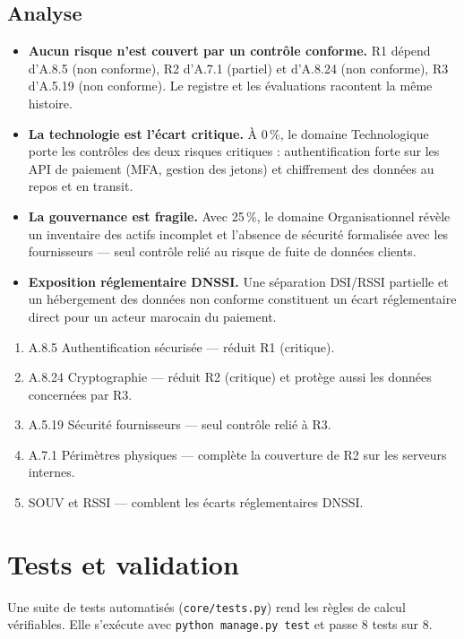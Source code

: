 \documentclass[11pt,a4paper]{article}
\newcommand{\code}[1]{\texttt{#1}}
\begin{document}
\subsection{Analyse}
\begin{itemize}
  \item \textbf{Aucun risque n'est couvert par un contrôle conforme.} R1 dépend d'A.8.5 (non conforme), R2 d'A.7.1 (partiel) et d'A.8.24 (non conforme), R3 d'A.5.19 (non conforme). Le registre et les évaluations racontent la même histoire.
  \item \textbf{La technologie est l'écart critique.} À 0\,\%, le domaine Technologique porte les contrôles des deux risques critiques : authentification forte sur les API de paiement (MFA, gestion des jetons) et chiffrement des données au repos et en transit.
  \item \textbf{La gouvernance est fragile.} Avec 25\,\%, le domaine Organisationnel révèle un inventaire des actifs incomplet et l'absence de sécurité formalisée avec les fournisseurs --- seul contrôle relié au risque de fuite de données clients.
  \item \textbf{Exposition réglementaire DNSSI.} Une séparation DSI/RSSI partielle et un hébergement des données non conforme constituent un écart réglementaire direct pour un acteur marocain du paiement.
\end{itemize}

\begin{keybox}[title=Ordre de remédiation recommandé]
\begin{enumerate}[leftmargin=*,label=\arabic*.]
  \item A.8.5 Authentification sécurisée --- réduit R1 (critique).
  \item A.8.24 Cryptographie --- réduit R2 (critique) et protège aussi les données concernées par R3.
  \item A.5.19 Sécurité fournisseurs --- seul contrôle relié à R3.
  \item A.7.1 Périmètres physiques --- complète la couverture de R2 sur les serveurs internes.
  \item SOUV et RSSI --- comblent les écarts réglementaires DNSSI.
\end{enumerate}
\end{keybox}

\section{Tests et validation}
Une suite de tests automatisés (\code{core/tests.py}) rend les règles de calcul vérifiables. Elle s'exécute avec \code{python manage.py test} et passe 8 tests sur 8.
\end{document}
